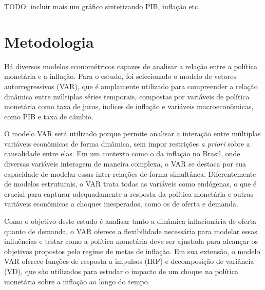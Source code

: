 \documentclass[12pt,oneside,a4paper,chapter=TITLE,english,brazil,sumario=abnt-6027-2012]{abntex2}
\begin{document}
TODO: incluir mais um gráfico sintetizando PIB, inflação etc.





\chapter{Metodologia}

Há diversos modelos econométricos capazes de analisar a relação entre a política monetária e a inflação. Para o estudo, foi selecionado o modelo de vetores autorregressivos (VAR), que é amplamente utilizado para compreender a relação dinâmica entre múltiplas séries temporais, compostas por variáveis de política monetária como taxa de juros, índices de inflação e variáveis macroeconômicas, como PIB e taxa de câmbio. 

O modelo VAR será utilizado porque permite analisar a interação entre múltiplas variáveis econômicas de forma dinâmica, sem impor restrições \textit{a priori} sobre a causalidade entre elas. Em um contexto como o da inflação no Brasil, onde diversas variáveis interagem de maneira complexa, o VAR se destaca por sua capacidade de modelar essas inter-relações de forma simultânea. Diferentemente de modelos estruturais, o VAR trata todas as variáveis como endógenas, o que é crucial para capturar adequadamente a resposta da política monetária e outras variáveis econômicas a choques inesperados, como os de oferta e demanda.

Como o objetivo deste estudo é analisar tanto a dinâmica inflacionária de oferta quanto de demanda, o VAR oferece a flexibilidade necessária para modelar essas influências e testar como a política monetária deve ser ajustada para alcançar os objetivos propostos pelo regime de metas de inflação. Em sua extensão, o modelo VAR oferece funções de resposta a impulsos (IRF) e decomposição de variância (VD), que são utilizados para estudar o impacto de um choque na política monetária sobre a inflação ao longo do tempo.
\end{document}
